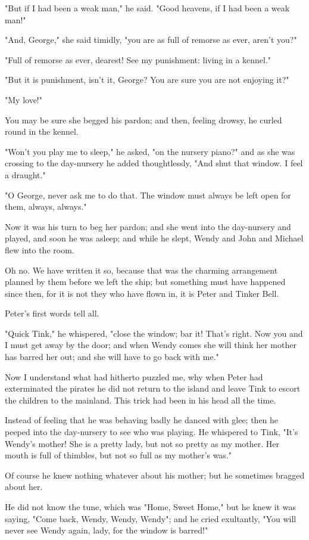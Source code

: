 "But if I had been a weak man," he said. "Good heavens, if I had been a
weak man!"


"And, George," she said timidly, "you are as full of remorse as ever,
aren't you?"


"Full of remorse as ever, dearest! See my punishment: living in a kennel."


"But it is punishment, isn't it, George? You are sure you are not enjoying
it?"


"My love!"


You may be sure she begged his pardon; and then, feeling drowsy, he curled
round in the kennel.


"Won't you play me to sleep," he asked, "on the nursery piano?" and as she
was crossing to the day-nursery he added thoughtlessly, "And shut that
window. I feel a draught."


"O George, never ask me to do that. The window must always be left open
for them, always, always."


Now it was his turn to beg her pardon; and she went into the day-nursery
and played, and soon he was asleep; and while he slept, Wendy and John and
Michael flew into the room.


Oh no. We have written it so, because that was the charming arrangement
planned by them before we left the ship; but something must have happened
since then, for it is not they who have flown in, it is Peter and Tinker
Bell.


Peter's first words tell all.


"Quick Tink," he whispered, "close the window; bar it! That's right. Now
you and I must get away by the door; and when Wendy comes she will think
her mother has barred her out; and she will have to go back with me."


Now I understand what had hitherto puzzled me, why when Peter had
exterminated the pirates he did not return to the island and leave Tink to
escort the children to the mainland. This trick had been in his head all
the time.


Instead of feeling that he was behaving badly he danced with glee; then he
peeped into the day-nursery to see who was playing. He whispered to Tink,
"It's Wendy's mother! She is a pretty lady, but not so pretty as my
mother. Her mouth is full of thimbles, but not so full as my mother's
was."


Of course he knew nothing whatever about his mother; but he sometimes
bragged about her.


He did not know the tune, which was "Home, Sweet Home," but he knew it was
saying, "Come back, Wendy, Wendy, Wendy"; and he cried exultantly, "You
will never see Wendy again, lady, for the window is barred!"


